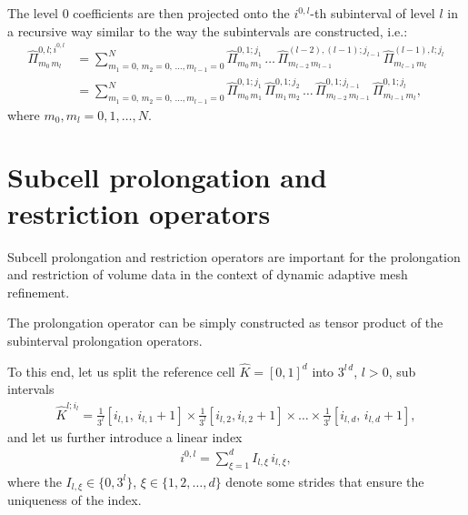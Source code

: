 \documentclass{scrreprt}
\theoremstyle{definition}
\theoremstyle{nonumberplain}
\newcommand{\cell}{K}
\newcommand{\refCell}{\hat{\cell}}
\begin{document}
The  level $0$ coefficients are then projected onto the $i^{0,l}$-th
subinterval of level $l$ in a recursive way similar to the way the 
subintervals are constructed, i.e.:
\begin{align}
\label{eq:amr:subinterval_recursion}
\hat{\Pi}^{0,l;i^{0,l}}_{m_0\,m_{l}}
&=
\sum_{m_{1}=0,\,m_{2}=0,\,\ldots,m_{l-1}=0}^N
\hat{\Pi}^{0,1;j_1}_{m_{0}\,m_{1}}\,
\ldots\,
\hat{\Pi}^{(l-2),(l-1);j_{l-1}}_{m_{l-2}\,m_{l-1}}\,\hat{\Pi}^{(l-1),l;j_l}_{m_{l-1}\,m_l}
\\
&=
\sum_{m_{1}=0,\,m_{2}=0,\,\ldots,m_{l-1}=0}^N
\hat{\Pi}^{0,1;j_1}_{m_{0}\,m_{1}}\,
\hat{\Pi}^{0,1;j_2}_{m_{1}\,m_{2}}\,
\ldots\,
\hat{\Pi}^{0,1;j_{l-1}}_{m_{l-2}\,m_{l-1}}\,\hat{\Pi}^{0,1;j_l}_{m_{l-1}\,m_l},
\end{align}
where $m_{0},m_{l}=0,1,\ldots,N$.

\section{Subcell prolongation and restriction operators}
\label{sec:amr:subcell_operators}
Subcell prolongation and restriction operators are important for the
prolongation and restriction of volume data in the context of dynamic
adaptive mesh refinement.

The prolongation operator can be simply constructed as tensor product of the
subinterval prolongation operators.

To this end, let us split the reference cell $\refCell=[0,1]^{d}$ into
$3^{l\,d}$, $l>0$, sub intervals
\begin{align}
\refCell^{l;i_l} = \frac{1}{3^{l}}[i_{l,1},\,i_{l,1}+1] \times
\frac{1}{3^{l}}[i_{l,2},i_{l,2}+1] \times \ldots \times
\frac{1}{3^{l}}[i_{l,{d}},\,i_{l,{d}}+1],
\end{align}
and let us further introduce a linear index
\begin{align}
\label{eq:ader_impl:amr:subface_index}
i^{0,l} = \sum_{\xi=1}^{d} I_{l,\xi}\,i_{l,\xi},
\end{align}
where the $I_{l,\xi}\in\{0,3^l\}$, $\xi \in \{1,2,\ldots,d\}$ denote some
strides that ensure the uniqueness of the index.
\end{document}
